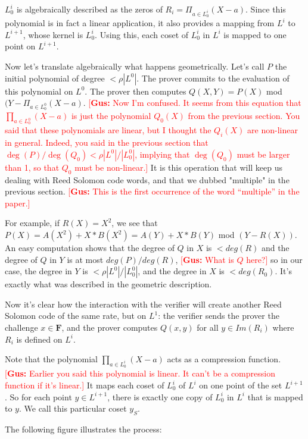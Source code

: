 \documentclass[12pt]{extarticle}
\newcommand{\<}{\langle}
\renewcommand{\>}{\rangle}
\theoremstyle{definition}
\newcommand{\gus}[1]{\textcolor{red}{[\textbf{Gus:} #1]}}
\begin{document}
$L^i_0$ is algebraically described as the zeros of $R_i=\Pi_{a\in L^i_0}(X-a)$. Since this polynomial is in fact a linear application, it also provides a mapping from $L^i$ to $L^{i+1}$, whose kernel is $L^i_0$. Using this, each coset of $L^i_0$ in $L^i$ is mapped to one point on $L^{i+1}$.

Now let's translate algebraically what happens geometrically. Let's call $P$ the initial polynomial of degree $<\rho|L^0|$. The prover commits to the evaluation of this polynomial on $L^0$. The prover then computes $Q(X,Y)=P(X)$ mod $(Y-\Pi_{a\in L^0_0}(X-a)$.
\gus{Now I'm confused.  It seems from this equation that $\prod_{a\in L^0_0}(X-a)$ is just the polynomial $Q_0(X)$ from the previous section.  You said that these polynomials are linear, but I thought the $Q_i(X)$ are non-linear in general.  Indeed, you said in the previous section that $\deg(P)/\deg(Q_0)<\rho|L^0|/|L^0_0|$, implying that $\deg(Q_0)$ must be larger than 1, so that $Q_0$ must be non-linear.}
It is this operation that will keep us dealing with Reed Solomon code words, and that we dubbed "multiple" in the previous section.
\gus{This is the first occurrence of the word ``multiple'' in the paper.}

For example, if $R(X)=X^2$, we see that $P(X)=A(X^2) + X*B(X^2)=A(Y)+X*B(Y)$ mod $(Y-R(X))$. An easy computation shows that the degree of $Q$ in $X$ is $<deg(R)$ and the degree of $Q$ in $Y$ is at most $deg(P)/deg(R)$, \gus{What is $Q$ here?} so in our case, the degree in $Y$ is $<\rho|L^0|/|L^0_0|$, and the degree in $X$ is $<deg(R_0)$. It's exactly what was described in the geometric description.

Now it's clear how the interaction with the verifier will create another Reed Solomon code of the same rate, but on $L^1$: the verifier sends the prover the challenge $x\in\mathbf{F}$, and the prover computes $Q(x,y)$ for all $y\in Im(R_i)$ where $R_i$ is defined on $L^i$.

Note that the polynomial $\prod_{a\in L^i_0}(X-a)$ acts as a compression function. \gus{Earlier you said this polynomial is linear.  It can't be a compression function if it's linear.}  It maps each coset of $L^i_0$ of $L^i$ on one point of the set $L^{i+1}$. So for each point $y\in L^{i+1}$, there is exactly one copy of $L^i_0$ in $L^i$ that is mapped to $y$. We call this particular coset $y_S$.

The following figure illustrates the process:
\end{document}
